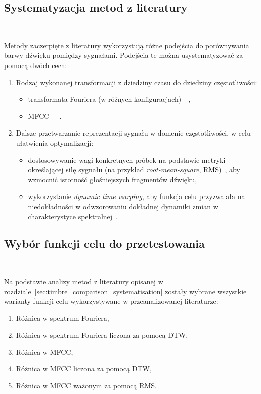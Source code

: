 \subsection{Systematyzacja metod z literatury}~\label{sec:timbre_comparison_systematisation}

Metody zaczerpięte z literatury wykorzystują różne podejścia do porównywania barwy dźwięku
pomiędzy sygnałami. Podejścia te można usystematyzować za pomocą dwóch cech:

\begin{enumerate}
  \item Rodzaj wykonanej transformacji z dziedziny czasu do dziedziny częstotliwości:
  \begin{itemize}
    \item transformata Fouriera (w różnych konfiguracjach)~\cite{riffusion}~\cite{ddx7},
    \item MFCC~\cite{ieee_synth_programming}~\cite{evolutionary_puredata}~\cite{mfcc_dtw}.
  \end{itemize}
  \item Dalsze przetwarzanie reprezentacji sygnału w domenie częstotliwości, w celu ułatwienia optymalizacji:
    \begin{itemize}
      \item dostosowywanie wagi konkretnych próbek na podstawie metryki określającej siłę sygnału
        (na przykład \textit{root-mean-square}, RMS)~\cite{parallel_evolutionary_optimization_synth_parameters},
        aby wzmocnić istotność głośniejszych fragmentów dźwięku,
      \item wykorzystanie \textit{dynamic time warping}, aby funkcja celu przyzwalała na
        niedokładności w odwzorowaniu dokładnej dynamiki zmian w charakterystyce spektralnej~\cite{mfcc_dtw}.
    \end{itemize}
\end{enumerate}

\subsection{Wybór funkcji celu do przetestowania}~\label{sec:considered_target_functions}

Na podstawie analizy metod z literatury opisanej w rozdziale~\ref{sec:timbre_comparison_systematisation} zostały wybrane wszystkie warianty
funkcji celu wykorzystywane w przeanalizowanej literaturze:

\begin{enumerate}
  \item Różnica w spektrum Fouriera,
  \item Różnica w spektrum Fouriera liczona za pomocą DTW,
  \item Różnica w MFCC,
  \item Różnica w MFCC liczona za pomocą DTW\@,
  \item Różnica w MFCC ważonym za pomocą RMS\@.
\end{enumerate}

